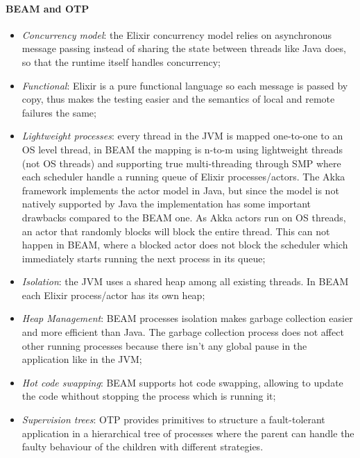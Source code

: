 \paragraph{BEAM and OTP}
\begin{itemize}
  \item \textit{Concurrency model}: the Elixir concurrency model relies on
        asynchronous message passing instead of sharing the state between
        threads like Java does, so that the runtime itself handles concurrency;
  \item \textit{Functional}: Elixir is a pure functional language
        so each message is passed by copy, thus makes the testing easier and the
        semantics of local and remote failures the same;
  \item \textit{Lightweight processes}: every thread in the JVM is mapped
        one-to-one to an OS level thread, in BEAM the mapping is n-to-m using
        lightweight threads (not OS threads) and supporting true multi-threading
        through SMP where each scheduler handle a running queue of Elixir
        processes/actors. The Akka framework implements the actor model in
        Java, but since the model is not natively supported by Java the
        implementation has some important drawbacks compared to the BEAM one.
        As Akka actors run on OS threads, an actor that randomly blocks will
        block the entire thread. This can not happen in BEAM, where a blocked
        actor does not block the scheduler which immediately starts running the
        next process in its queue;
  \item \textit{Isolation}: the JVM uses a shared heap among all existing
        threads. In BEAM each Elixir process/actor has its own heap;
  \item \textit{Heap Management}: BEAM processes isolation makes garbage
        collection easier and more efficient than Java. The garbage collection
        process does not affect other running processes because there isn't any
        global pause in the application like in the JVM;
    \item \textit{Hot code swapping}: BEAM supports hot code swapping, allowing
        to update the code whithout stopping the process which is running it;
    \item \textit{Supervision trees}: OTP provides primitives to structure a
        fault-tolerant application in a hierarchical tree of processes where
        the parent can handle the faulty behaviour of the children with
        different strategies.
\end{itemize}
